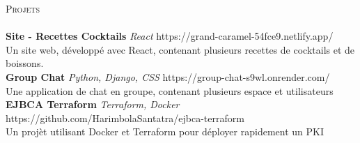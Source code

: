\documentclass[a4paper]{article}
\newcommand{\lineunder} {
    \vspace*{-8pt} \\
    \hspace*{-18pt} \hrulefill \\
}
\newcommand{\header} [1] {
    {\hspace*{-18pt}\vspace*{6pt} \textsc{#1}}
    \vspace*{-6pt} \lineunder
}
\begin{document}
\header{Projets}
{\textbf{Site - Recettes Cocktails}} {\sl React} \hfill https://grand-caramel-54fce9.netlify.app/\\
Un site web, développé avec React, contenant plusieurs recettes de cocktails et de boissons.\\
\vspace*{2mm}
{\textbf{Group Chat}} {\sl Python, Django, CSS} \hfill https://group-chat-s9wl.onrender.com/\\
Une application de chat en groupe, contenant plusieurs espace et utilisateurs\\
\vspace*{2mm}
{\textbf{EJBCA Terraform}} {\sl Terraform, Docker} \hfill https://github.com/HarimbolaSantatra/ejbca-terraform\\
Un projèt utilisant Docker et Terraform pour déployer rapidement un PKI\\
\vspace*{2mm}



\ 
\end{document}
